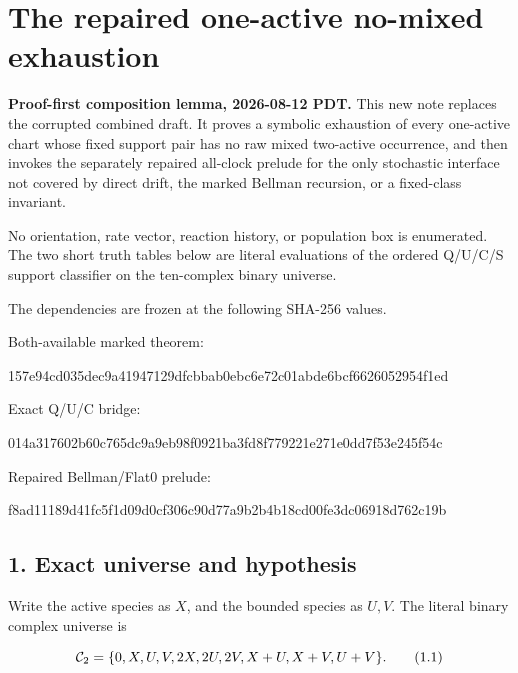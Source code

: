 \section{The repaired one-active no-mixed
exhaustion}

\textbf{Proof-first composition lemma, 2026-08-12 PDT.} This new note
replaces the corrupted combined draft. It proves a symbolic exhaustion
of every one-active chart whose fixed support pair has no raw mixed
two-active occurrence, and then invokes the separately repaired
all-clock prelude for the only stochastic interface not covered by
direct drift, the marked Bellman recursion, or a fixed-class invariant.

No orientation, rate vector, reaction history, or population box is
enumerated. The two short truth tables below are literal evaluations of
the ordered Q/U/C/S support classifier on the ten-complex binary
universe.

The dependencies are frozen at the following SHA-256 values.

Both-available marked theorem:

\begingroup\scriptsize\ttfamily

157e94cd035dec9a41947129dfcbbab0ebc6e72c01abde6bcf6626052954f1ed

\par\endgroup

Exact Q/U/C bridge:

\begingroup\scriptsize\ttfamily

014a317602b60c765dc9a9eb98f0921ba3fd8f779221e271e0dd7f53e245f54c

\par\endgroup

Repaired Bellman/Flat0 prelude:

\begingroup\scriptsize\ttfamily

f8ad11189d41fc5f1d09d0cf306c90d77a9b2b4b18cd00fe3dc06918d762c19b

\par\endgroup

\subsection{1. Exact universe and
hypothesis}

Write the active species as \(X\), and the bounded species as \(U,V\).
The literal binary complex universe is

\[
 {\cal C}_2=\{0,X,U,V,2X,2U,2V,X+U,X+V,U+V\}.       \tag{1.1}
\]

